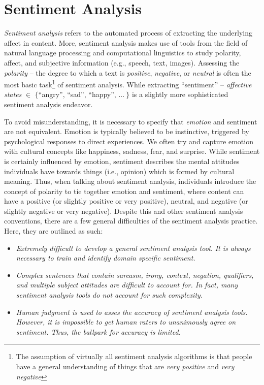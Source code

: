 \thispagestyle{empty}
\section{Sentiment Analysis}
\frenchspacing
\textit{Sentiment analysis} refers to the automated process of extracting the underlying affect in content. More, sentiment analysis makes use of tools from the field of natural language processing and computational linguistics to study polarity, affect, and subjective information (e.g., speech, text, images). Assessing the \textit{polarity} -- the degree to which a text is \textit{positive}, \textit{negative}, or \textit{neutral} is often the most basic task\footnote{The assumption of virtually all sentiment analysis algorithms is that people have a general understanding of things that are \textit{very positive} and \textit{very negative}} of sentiment analysis. 
While extracting \enquote{sentiment} -- \textit{affective states} $\in$  $\lbrace$\enquote{angry}, \enquote{sad}, \enquote{happy}, $... \ \rbrace$ is a slightly more sophisticated sentiment analysis endeavor.

To avoid misunderstanding, it is necessary to specify that \textit{emotion} and sentiment are not equivalent. Emotion is typically believed to be instinctive, triggered by psychological responses to direct experiences. We often try and capture emotion with cultural concepts like happiness, sadness, fear, and surprise. While sentiment is certainly influenced by emotion, sentiment describes the mental attitudes individuals have towards things (i.e., opinion) which is formed by cultural meaning. Thus, when talking about sentiment analysis, individuals introduce the concept of polarity to tie together emotion and sentiment, where content can have a positive (or slightly positive or very positive), neutral, and negative (or slightly negative or very negative). Despite this and other sentiment analysis conventions, there are a few general difficulties of the sentiment analysis practice. Here, they are outlined as such:

\begin{itemize}
\item \textit{Extremely difficult to develop a general sentiment analysis tool. It is always necessary to train and identify domain specific sentiment. }
\item \textit{Complex sentences that contain sarcasm, irony, context, negation, qualifiers, and multiple subject attitudes are difficult to account for. In fact, many sentiment analysis tools do not account for such complexity.}
\item \textit{Human judgment is used to asses the accuracy of sentiment analysis tools. However, it is impossible to get human raters to unanimously agree on sentiment. Thus, the ballpark for accuracy is limited.}
\end{itemize}

